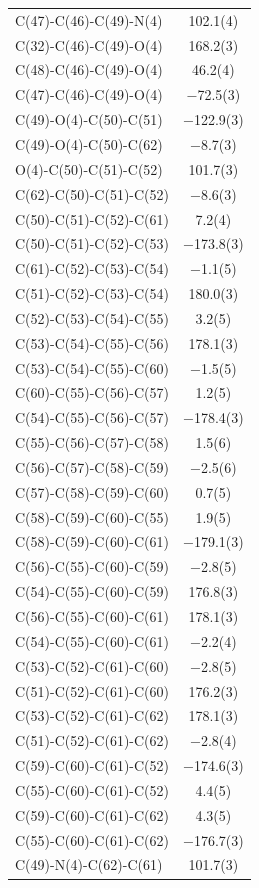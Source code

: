 \begin{center}
{\begin{supertabular}{p{1.8in}c}
C(47)-C(46)-C(49)-N(4)&102.1(4)\\
C(32)-C(46)-C(49)-O(4)&168.2(3)\\
C(48)-C(46)-C(49)-O(4)&46.2(4)\\
C(47)-C(46)-C(49)-O(4)&$-$72.5(3)\\
C(49)-O(4)-C(50)-C(51)&$-$122.9(3)\\
C(49)-O(4)-C(50)-C(62)&$-$8.7(3)\\
O(4)-C(50)-C(51)-C(52)&101.7(3)\\
C(62)-C(50)-C(51)-C(52)&$-$8.6(3)\\
C(50)-C(51)-C(52)-C(61)&7.2(4)\\
C(50)-C(51)-C(52)-C(53)&$-$173.8(3)\\
C(61)-C(52)-C(53)-C(54)&$-$1.1(5)\\
C(51)-C(52)-C(53)-C(54)&180.0(3)\\
C(52)-C(53)-C(54)-C(55)&3.2(5)\\
C(53)-C(54)-C(55)-C(56)&178.1(3)\\
C(53)-C(54)-C(55)-C(60)&$-$1.5(5)\\
C(60)-C(55)-C(56)-C(57)&1.2(5)\\
C(54)-C(55)-C(56)-C(57)&$-$178.4(3)\\
C(55)-C(56)-C(57)-C(58)&1.5(6)\\
C(56)-C(57)-C(58)-C(59)&$-$2.5(6)\\
C(57)-C(58)-C(59)-C(60)&0.7(5)\\
C(58)-C(59)-C(60)-C(55)&1.9(5)\\
C(58)-C(59)-C(60)-C(61)&$-$179.1(3)\\
C(56)-C(55)-C(60)-C(59)&$-$2.8(5)\\
C(54)-C(55)-C(60)-C(59)&176.8(3)\\
C(56)-C(55)-C(60)-C(61)&178.1(3)\\
C(54)-C(55)-C(60)-C(61)&$-$2.2(4)\\
C(53)-C(52)-C(61)-C(60)&$-$2.8(5)\\
C(51)-C(52)-C(61)-C(60)&176.2(3)\\
C(53)-C(52)-C(61)-C(62)&178.1(3)\\
C(51)-C(52)-C(61)-C(62)&$-$2.8(4)\\
C(59)-C(60)-C(61)-C(52)&$-$174.6(3)\\
C(55)-C(60)-C(61)-C(52)&4.4(5)\\
C(59)-C(60)-C(61)-C(62)&4.3(5)\\
C(55)-C(60)-C(61)-C(62)&$-$176.7(3)\\
C(49)-N(4)-C(62)-C(61)&101.7(3)\\

\end{supertabular}}
\end{center}
